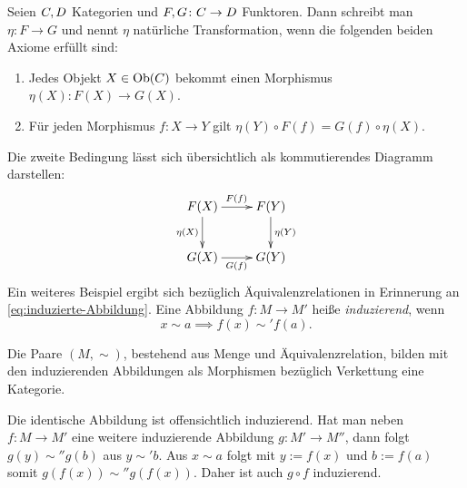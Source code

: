 \begin{Definition}
Seien $C, D$ Kategorien und
$F,G\colon C\to D$ Funktoren.
Dann schreibt man $\eta\colon F\to G$ und nennt $\eta$ natürliche
Transformation, wenn die folgenden beiden Axiome erfüllt sind:
\begin{enumerate}
\item Jedes Objekt $X\in\operatorname{Ob}(C)$ bekommt einen Morphismus
$\eta(X)\colon F(X)\to G(X)$.
\item Für jeden Morphismus $f\colon X\to Y$ gilt
$\eta(Y)\circ F(f)=G(f)\circ\eta(X)$.
\end{enumerate}
\end{Definition}
Die zweite Bedingung lässt sich übersichtlich als kommutierendes Diagramm
darstellen:
\[\xymatrix{
F(X) \ar[r]^{F(f)} \ar[d]_{\eta(X)} & F(Y) \ar[d]^{\eta(Y)} \\
G(X) \ar[r]_{G(f)} & G(Y)}\]
Ein weiteres Beispiel ergibt sich bezüglich Äquivalenzrelationen
in Erinnerung an \eqref{eq:induzierte-Abbildung}.
Eine Abbildung $f\colon M\to M'$ heiße \emph{induzierend}, wenn%
\begin{equation}
x\sim a \implies f(x)\sim' f(a).
\end{equation}
\begin{Satz}
Die Paare $(M,\sim)$, bestehend aus Menge und Äquivalenzrelation,
bilden mit den induzierenden Abbildungen
als Morphismen bezüglich Verkettung eine Kategorie.
\end{Satz}
Die identische Abbildung ist offensichtlich induzierend. Hat man
neben $f\colon M\to M'$ eine weitere induzierende Abbildung $g\colon M'\to M''$, dann
folgt $g(y)\sim'' g(b)$ aus $y\sim' b$. Aus $x\sim a$ folgt
mit $y:=f(x)$ und $b:=f(a)$ somit $g(f(x))\sim'' g(f(x))$.
Daher ist auch $g\circ f$ induzierend.\;\qedsymbol

